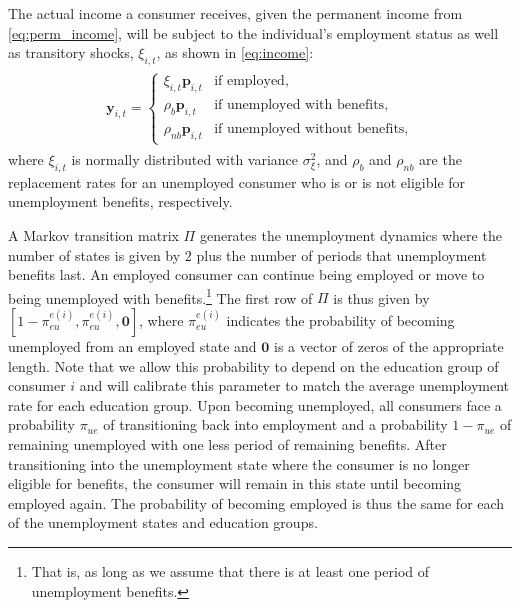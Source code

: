 \documentclass[qe,draft]{econsocart}
\theoremstyle{plain}
\theoremstyle{definition}
\begin{document}
The actual income a consumer receives, given the permanent income from \eqref{eq:perm_income}, will be subject to the individual's employment status as well as transitory shocks, $\xi_{i,t}$, as shown in \eqref{eq:income}:
\begin{equation}
  \begin{gathered}
    \begin{aligned}
      \mathbf{y}_{i,t} =   \begin{cases}
                             \xi_{i,t}\mathbf{p}_{i,t}  & \text{if employed},                    \\
                             \rho_b \mathbf{p}_{i,t}    & \text{if unemployed with benefits},    \\
                             \rho_{nb} \mathbf{p}_{i,t} & \text{if unemployed without benefits},
                           \end{cases}
      \label{eq:income} %
    \end{aligned}
  \end{gathered}
\end{equation}
where $\xi_{i,t}$ is normally distributed with variance $\sigma_{\xi}^2$, and $\rho_b$ and $\rho_{nb}$ are the replacement rates for an unemployed consumer who is or is not eligible for unemployment benefits, respectively.

A Markov transition matrix $\Pi$ generates the unemployment dynamics where the number of states is given by $2$ plus the number of periods that unemployment benefits last.
An employed consumer can continue being employed or move to being unemployed with benefits.\footnote{That is, as long as we assume that there is at least one period of unemployment benefits.} The first row of $\Pi$ is thus given by $[1-\pi_{eu}^{e(i)}, \pi_{eu}^{e(i)}, \mathbf{0}]$, where $\pi_{eu}^{e(i)}$ indicates the probability of becoming unemployed from an employed state and $\mathbf{0}$ is a vector of zeros of the appropriate length.
Note that we allow this probability to depend on the education group of consumer $i$ and will calibrate this parameter to match the average unemployment rate for each education group.
Upon becoming unemployed, all consumers face a probability $\pi_{ue}$ of transitioning back into employment and a probability $1-\pi_{ue}$ of remaining unemployed with one less period of remaining benefits.
After transitioning into the unemployment state where the consumer is no longer eligible for benefits, the consumer will remain in this state until becoming employed again.
The probability of becoming employed is thus the same for each of the unemployment states and education groups.
\end{document}
